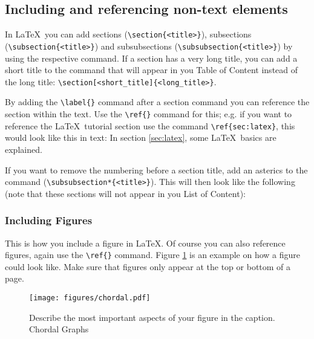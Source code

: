 \subsection{Including and referencing non-text elements}
  \label{sec:inre}
In \LaTeX\ you can add sections (\verb|\section{<title>}|), subsections (\verb|\subsection{<title>}|) and subsubsections (\verb|\subsubsection{<title>}|) by using the respective command. If a section has a very long title, you can add a short title to the command that will appear in you Table of Content instead of the long title: \verb|\section[<short_title]{<long_title>}|.

By adding the \verb|\label{}| command after a section command you can reference the section within the text. Use the \verb|\ref{}| command for this; e.g. if you want to reference the \LaTeX\ tutorial section use the command \verb|\ref{sec:latex}|, this would look like this in text: In section \ref{sec:latex}, some \LaTeX\ basics are explained.

If you want to remove the numbering before a section title, add an asterics to the command (\verb|\subsubsection*{<title>}|). This will then look like the following (note that these sections will not appear in you List of Content):

\subsubsection*{Including Figures}
This is how you include a figure in \LaTeX. Of course you can also reference figures, again use the \verb|\ref{}| command. Figure \ref{fig:exmp} is an example on how a figure could look like. Make sure that figures only appear at the top or bottom of a page.
\begin{figure}[tb]
  \centering
  \texttt{[image: figures/chordal.pdf]}
  \caption{Describe the most important aspects of your figure in the caption. Chordal Graphs}
  \label{fig:exmp}
\end{figure}


